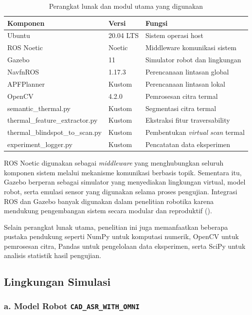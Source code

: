 \begin{table}[H]
\centering
\caption{Perangkat lunak dan modul utama yang digunakan}
\label{tab:perangkat_lunak}
\begin{tabular}{p{3.5cm}p{2cm}p{7cm}}
\toprule
\textbf{Komponen} & \textbf{Versi} & \textbf{Fungsi} \\
\midrule
Ubuntu & 20.04 LTS & Sistem operasi host \\
ROS Noetic & Noetic & Middleware komunikasi sistem \\
Gazebo & 11 & Simulator robot dan lingkungan \\
NavfnROS & 1.17.3 & Perencanaan lintasan global \\
APFPlanner & Kustom & Perencanaan lintasan lokal \\
OpenCV & 4.2.0 & Pemrosesan citra termal \\
semantic\-\_thermal.py & Kustom & Segmentasi citra termal \\
thermal\_feature\-\_extractor.py & Kustom & Ekstraksi fitur traversability \\
thermal\_blindspot\-\_to\_scan.py & Kustom & Pembentukan \textit{virtual scan} termal \\
experiment\-\_logger.py & Kustom & Pencatatan data eksperimen \\
\bottomrule
\end{tabular}
\end{table}

ROS Noetic digunakan sebagai \textit{middleware} yang menghubungkan seluruh komponen sistem melalui mekanisme komunikasi berbasis topik. Sementara itu, Gazebo berperan sebagai simulator yang menyediakan lingkungan virtual, model robot, serta emulasi sensor yang digunakan selama proses pengujian. Integrasi ROS dan Gazebo banyak digunakan dalam penelitian robotika karena mendukung pengembangan sistem secara modular dan reproduktif (\cite{Macenski2022,Adiuku2024}).

Selain perangkat lunak utama, penelitian ini juga memanfaatkan beberapa pustaka pendukung seperti NumPy untuk komputasi numerik, OpenCV untuk pemrosesan citra, Pandas untuk pengelolaan data eksperimen, serta SciPy untuk analisis statistik hasil pengujian.

\subsection{Lingkungan Simulasi}
\label{sec:lingkungan_simulasi}

\subsubsection*{a. Model Robot \texttt{CAD\_ASR\_WITH\_OMNI}}

